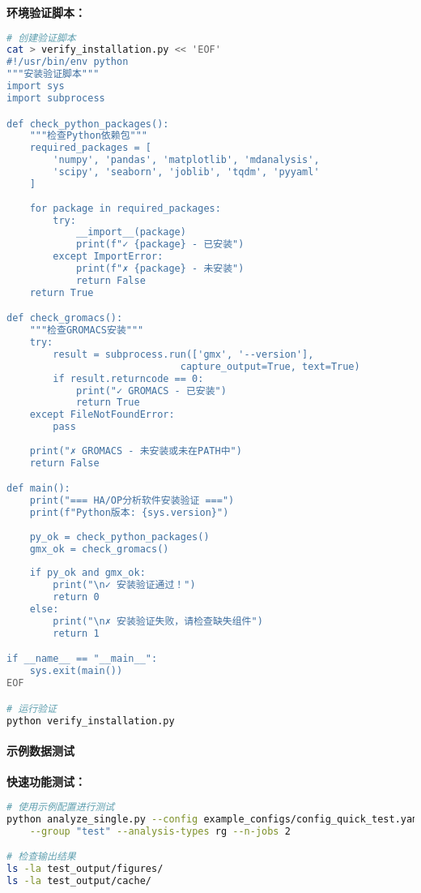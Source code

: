 \textbf{环境验证脚本：}
\begin{lstlisting}[language=bash,style=blockstyle]
# 创建验证脚本
cat > verify_installation.py << 'EOF'
#!/usr/bin/env python
"""安装验证脚本"""
import sys
import subprocess

def check_python_packages():
    """检查Python依赖包"""
    required_packages = [
        'numpy', 'pandas', 'matplotlib', 'mdanalysis', 
        'scipy', 'seaborn', 'joblib', 'tqdm', 'pyyaml'
    ]
    
    for package in required_packages:
        try:
            __import__(package)
            print(f"✓ {package} - 已安装")
        except ImportError:
            print(f"✗ {package} - 未安装")
            return False
    return True

def check_gromacs():
    """检查GROMACS安装"""
    try:
        result = subprocess.run(['gmx', '--version'], 
                              capture_output=True, text=True)
        if result.returncode == 0:
            print("✓ GROMACS - 已安装")
            return True
    except FileNotFoundError:
        pass
    
    print("✗ GROMACS - 未安装或未在PATH中")
    return False

def main():
    print("=== HA/OP分析软件安装验证 ===")
    print(f"Python版本: {sys.version}")
    
    py_ok = check_python_packages()
    gmx_ok = check_gromacs()
    
    if py_ok and gmx_ok:
        print("\n✓ 安装验证通过！")
        return 0
    else:
        print("\n✗ 安装验证失败，请检查缺失组件")
        return 1

if __name__ == "__main__":
    sys.exit(main())
EOF

# 运行验证
python verify_installation.py
\end{lstlisting}

\paragraph{示例数据测试}

\textbf{快速功能测试：}
\begin{lstlisting}[language=bash,style=blockstyle]
# 使用示例配置进行测试
python analyze_single.py --config example_configs/config_quick_test.yaml \
    --group "test" --analysis-types rg --n-jobs 2

# 检查输出结果
ls -la test_output/figures/
ls -la test_output/cache/
\end{lstlisting}

